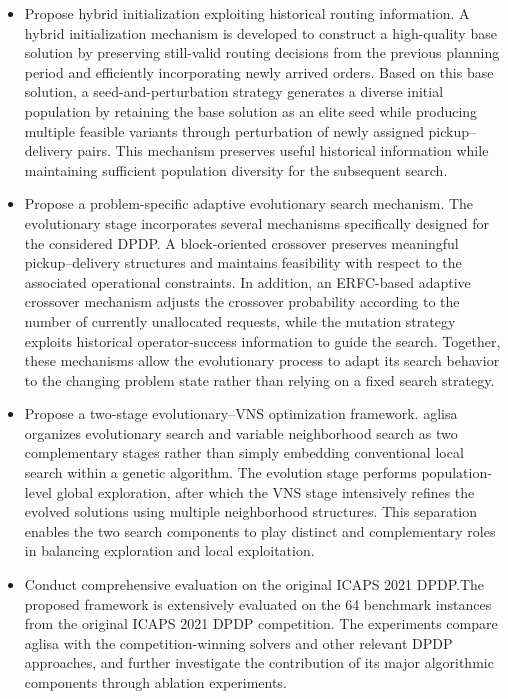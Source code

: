 \documentclass[pdflatex]{sn-jnl}
\begin{document}
\begin{itemize}

\item Propose hybrid initialization exploiting historical routing information. A hybrid initialization mechanism is developed to construct a high-quality base solution by preserving still-valid routing decisions from the previous 
planning period and efficiently incorporating newly arrived orders. Based on this base solution, a seed-and-perturbation strategy generates a diverse initial population by retaining the base solution as an elite seed while producing multiple feasible variants through perturbation of newly assigned 
pickup--delivery pairs. This mechanism preserves useful historical information while maintaining sufficient population diversity for the subsequent search.

\item Propose a problem-specific adaptive evolutionary search mechanism. The evolutionary stage incorporates several mechanisms specifically designed for the considered DPDP. A block-oriented crossover preserves meaningful pickup--delivery structures and maintains feasibility with respect to the associated operational constraints. In addition, an ERFC-based adaptive crossover mechanism adjusts the crossover probability according to the 
number of currently unallocated requests, while the mutation strategy exploits historical operator-success information to guide the search. Together, these mechanisms allow the evolutionary process to adapt its search behavior to the changing problem state rather than relying on a fixed search strategy.

\item Propose a two-stage evolutionary--VNS optimization framework. \gls{aglisa} organizes evolutionary search and variable neighborhood search as two complementary stages rather than simply embedding conventional local search within a genetic algorithm. The evolution stage performs population-level 
global exploration, after which the VNS stage intensively refines the evolved solutions using multiple neighborhood structures. This separation enables the two search components to play distinct and complementary roles in balancing exploration and local exploitation.

\item Conduct comprehensive evaluation on the original ICAPS 2021 DPDP.The proposed framework is extensively evaluated on the 64 benchmark instances from the original ICAPS 2021 DPDP competition. The experiments compare \gls{aglisa} with the competition-winning solvers and other relevant DPDP approaches, and further investigate the contribution of its major algorithmic components through ablation experiments.

\end{itemize}
\end{document}
